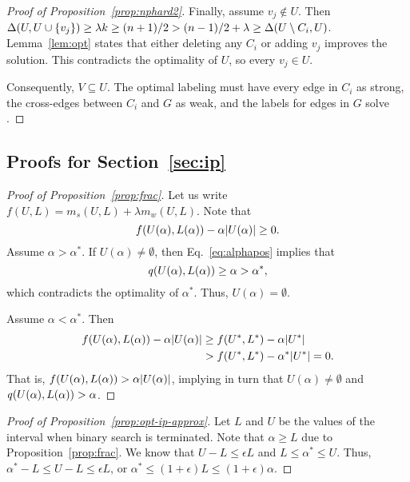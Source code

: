 \begin{proof}[Proof of Proposition~\ref{prop:nphard2}]
Finally, assume $v_j \notin U$. Then $\Delta(U, U \cup \left\{v_j\right\}) \geq \lambda k \geq (n + 1)/2 > (n - 1)/2 + \lambda \geq \Delta(U \setminus C_i, U)$. Lemma~\ref{lem:opt} states that either deleting any $C_i$ or adding $v_j$ improves the solution. This contradicts the optimality of $U$, so every $v_j \in U$.

Consequently, $V \subseteq U$. The optimal labeling must have every edge in $C_i$ as strong, the cross-edges between $C_i$ and $G$ as weak, and the labels for edges in $G$ solve \prbminSTC.
\end{proof}

\subsection{Proofs for Section~\ref{sec:ip}}
\label{appendix:ip}


\begin{proof}[Proof of Proposition~\ref{prop:frac}]
Let us write $f(U, L) = m_s(U, L) + \lambda m_w(U, L)$.
Note that
\begin{equation}
\label{eq:alphapos}
    f(U(\alpha), L(\alpha)) - \alpha {\left|U(\alpha)\right|} \geq 0.
\end{equation}
Assume $\alpha > \alpha^*$. If $U(\alpha) \neq \emptyset$, then Eq.~\ref{eq:alphapos} implies that
\[
    \score{U(\alpha), L(\alpha)} \geq \alpha > \alpha^*,
\]
which contradicts the optimality of $\alpha^*$. Thus, $U(\alpha) = \emptyset$.

Assume $\alpha < \alpha^*$. Then
\[
\begin{split}
    f(U(\alpha), L(\alpha)) - \alpha {\left|U(\alpha)\right|} & \geq f(U^*, L^*) - \alpha {\left|U^*\right|} \\
    & > f(U^*, L^*) - \alpha^* {\left|U^*\right|} = 0.
\end{split}
\]
That is, $f(U(\alpha), L(\alpha)) >  \alpha {\left|U(\alpha)\right|}$, implying in turn that $U(\alpha) \neq \emptyset$ and $\score{U(\alpha), L(\alpha)} > \alpha$.
\end{proof}


\begin{proof}[Proof of Proposition~\ref{prop:opt-ip-approx}]
Let $L$ and $U$ be the values of the interval when binary search is terminated. Note that $\alpha \geq L$ due to Proposition~\ref{prop:frac}.
We know that $U - L \leq \epsilon L$ and $L \leq \alpha^* \leq U$. Thus,
$\alpha^* - L \leq U - L \leq \epsilon L$, or $\alpha^*  \leq (1 + \epsilon) L \leq (1 + \epsilon) \alpha$.
\end{proof}

